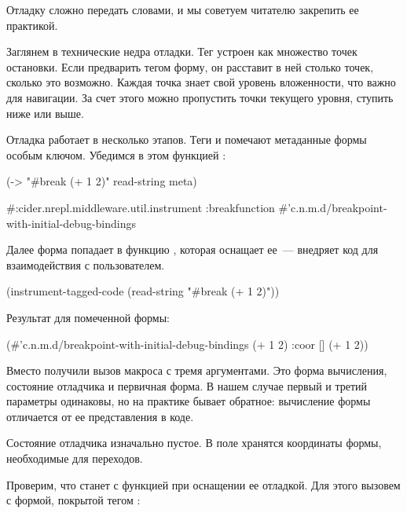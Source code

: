 Отладку сложно передать словами, и мы советуем читателю закрепить ее практикой.

Заглянем в технические недра отладки. Тег  устроен как множество точек остановки. Если предварить тегом форму, он расставит в ней столько точек, сколько это возможно. Каждая точка знает свой уровень вложенности, что важно для навигации. За счет этого можно пропустить точки текущего уровня, ступить ниже или выше.

Отладка работает в несколько этапов. Теги  и  помечают метаданные формы особым ключом. Убедимся в этом функцией :

\begin{english}
  \begin{clojure}
(-> "#break (+ 1 2)"
    read-string
    meta)

#:cider.nrepl.middleware.util.instrument
{:breakfunction
 #'c.n.m.d/breakpoint-with-initial-debug-bindings}
  \end{clojure}
\end{english}

Далее форма попадает в функцию , которая оснащает ее~--- внедряет код для взаимодействия с пользователем.

\begin{english}
  \begin{clojure}
(instrument-tagged-code
 (read-string "#break (+ 1 2)"))
  \end{clojure}
\end{english}

Результат для помеченной формы:

\begin{english}
  \begin{clojure}
(#'c.n.m.d/breakpoint-with-initial-debug-bindings
 (+ 1 2) {:coor []} (+ 1 2))
  \end{clojure}
\end{english}

Вместо  получили вызов макроса  с тремя аргументами. Это форма вычисления, состояние отладчика и первичная форма. В нашем случае первый и третий параметры одинаковы, но на практике бывает обратное: вычисление формы отличается от ее представления в коде.

Состояние отладчика изначально пустое. В поле  хранятся координаты формы, необходимые для переходов.

Проверим, что станет с функцией  при оснащении ее отладкой. Для этого вызовем  с формой, покрытой тегом :

